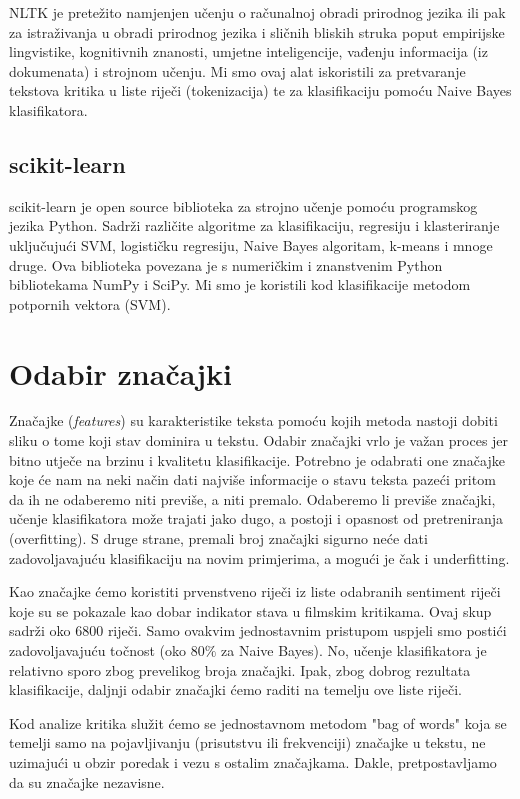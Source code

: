 \documentclass[conference]{IEEEtran}
\begin{document}
NLTK je pretežito namjenjen učenju o računalnoj obradi prirodnog jezika ili pak za istraživanja u obradi prirodnog jezika i sličnih bliskih struka poput empirijske lingvistike, kognitivnih znanosti, umjetne inteligencije, vađenju informacija (iz dokumenata) i strojnom učenju. Mi smo ovaj alat iskoristili za pretvaranje tekstova kritika u liste riječi (tokenizacija) te za klasifikaciju pomoću Naive Bayes klasifikatora.

\subsection{scikit-learn}

scikit-learn je open source biblioteka za strojno učenje pomoću programskog jezika Python. Sadrži različite algoritme za klasifikaciju, regresiju i klasteriranje uključujući SVM, logističku regresiju, Naive Bayes algoritam, k-means i mnoge druge. Ova biblioteka povezana je s numeričkim i znanstvenim Python bibliotekama NumPy i SciPy. Mi smo je koristili kod klasifikacije metodom potpornih vektora (SVM).

\section{Odabir značajki}

Značajke (\textit{features}) su karakteristike teksta pomoću kojih metoda nastoji dobiti sliku o tome koji stav dominira u tekstu. Odabir značajki vrlo je važan proces jer bitno utječe na brzinu i kvalitetu klasifikacije. Potrebno je odabrati one značajke koje će nam na neki način dati najviše informacije o stavu teksta pazeći pritom da ih ne odaberemo niti previše, a niti premalo. Odaberemo li previše značajki, učenje klasifikatora može trajati jako dugo, a postoji i opasnost od pretreniranja (overfitting). S druge strane, premali broj značajki sigurno neće dati zadovoljavajuću klasifikaciju na novim primjerima, a mogući je čak i underfitting.

Kao značajke ćemo koristiti prvenstveno riječi iz liste odabranih sentiment riječi \cite{words} koje su se pokazale kao dobar indikator stava u filmskim kritikama. Ovaj skup sadrži oko 6800 riječi. Samo ovakvim jednostavnim pristupom uspjeli smo postići zadovoljavajuću točnost (oko $80\%$ za Naive Bayes). No, učenje klasifikatora je relativno sporo zbog prevelikog broja značajki. Ipak, zbog dobrog rezultata klasifikacije, daljnji odabir značajki ćemo raditi na temelju ove liste riječi.

Kod analize kritika služit ćemo se jednostavnom metodom "bag of words" koja se temelji samo na pojavljivanju (prisutstvu ili frekvenciji) značajke u tekstu, ne uzimajući u obzir poredak i vezu s ostalim značajkama. Dakle, pretpostavljamo da su značajke nezavisne.
\end{document}
